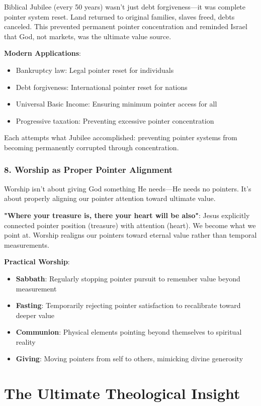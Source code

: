 \documentclass[11pt,oneside]{book}
\begin{document}
Biblical Jubilee (every 50 years) wasn't just debt forgiveness—it was complete pointer system reset. Land returned to original families, slaves freed, debts canceled. This prevented permanent pointer concentration and reminded Israel that God, not markets, was the ultimate value source.

\textbf{Modern Applications}:
\begin{itemize}
\item Bankruptcy law: Legal pointer reset for individuals
\item Debt forgiveness: International pointer reset for nations
\item Universal Basic Income: Ensuring minimum pointer access for all
\item Progressive taxation: Preventing excessive pointer concentration
\end{itemize}

Each attempts what Jubilee accomplished: preventing pointer systems from becoming permanently corrupted through concentration.

\subsubsection{8. Worship as Proper Pointer Alignment}

Worship isn't about giving God something He needs—He needs no pointers. It's about properly aligning our pointer attention toward ultimate value.

\textbf{"Where your treasure is, there your heart will be also"}: Jesus explicitly connected pointer position (treasure) with attention (heart). We become what we point at. Worship realigns our pointers toward eternal value rather than temporal measurements.

\textbf{Practical Worship}:
\begin{itemize}
\item \textbf{Sabbath}: Regularly stopping pointer pursuit to remember value beyond measurement
\item \textbf{Fasting}: Temporarily rejecting pointer satisfaction to recalibrate toward deeper value
\item \textbf{Communion}: Physical elements pointing beyond themselves to spiritual reality
\item \textbf{Giving}: Moving pointers from self to others, mimicking divine generosity
\end{itemize}

\section{The Ultimate Theological Insight}
\end{document}
